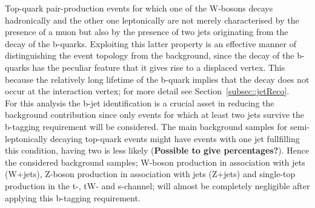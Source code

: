 Top-quark pair-production events for which one of the W-bosons decays hadronically and the other one leptonically are not merely characterised by the presence of a muon but also by the presence of two jets originating from the decay of the b-quarks.
Exploiting this latter property is an effective manner of distinguishing the event topology from the background, since the decay of the b-quarks has the peculiar feature that it gives rise to a displaced vertex. This because the relatively long lifetime of the b-quark implies that the decay does not occur at the interaction vertex; for more detail see Section~\ref{subsec::jetReco}.
\\ 

For this analysis the b-jet identification is a crucial asset in reducing the background contribution since only events for which at least two jets survive the b-tagging requirement will be considered. The main background samples for semi-leptonically decaying top-quark events might have events with one jet fullfilling this condition, having two  is less likely (\textbf{Possible to give percentages?}). Hence the considered background samples; W-boson production in association with jets (W+jets), Z-boson production in association with jets (Z+jets) and single-top production in the t-, tW- and s-channel; will almost be completely negligible after applying this b-tagging requirement.
\\

